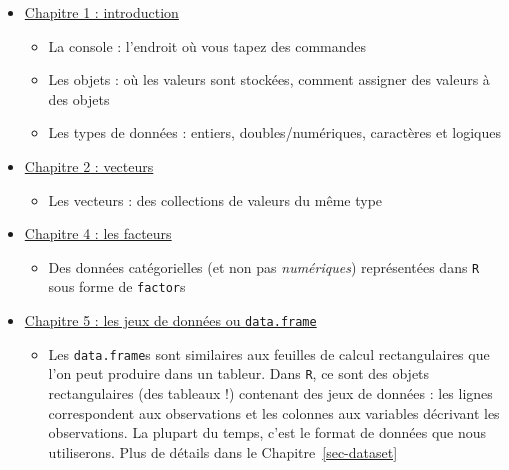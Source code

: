 \documentclass[
  letterpaper,
  DIV=11,
  numbers=noendperiod]{scrreprt}
\providecommand{\tightlist}{%
  \setlength{\itemsep}{0pt}\setlength{\parskip}{0pt}}\usepackage{longtable,booktabs,array}
\begin{document}
\begin{itemize}
\tightlist
\item
  \href{https://campus.datacamp.com/courses/introduction-a-r/chapitre-1-introduction?ex=1}{Chapitre
  1 : introduction}

  \begin{itemize}
  \tightlist
  \item
    La console : l'endroit où vous tapez des commandes
  \item
    Les objets : où les valeurs sont stockées, comment assigner des
    valeurs à des objets
  \item
    Les types de données : entiers, doubles/numériques, caractères et
    logiques
  \end{itemize}
\item
  \href{https://campus.datacamp.com/courses/introduction-a-r/chapitre-2-les-vecteurs?ex=1}{Chapitre
  2 : vecteurs}

  \begin{itemize}
  \tightlist
  \item
    Les vecteurs : des collections de valeurs du même type
  \end{itemize}
\item
  \href{https://campus.datacamp.com/courses/introduction-a-r/chapitre-4-facteurs?ex=1}{Chapitre
  4 : les facteurs}

  \begin{itemize}
  \tightlist
  \item
    Des données catégorielles (et non pas \emph{numériques})
    représentées dans \texttt{R} sous forme de \texttt{factor}s
  \end{itemize}
\item
  \href{https://campus.datacamp.com/courses/introduction-a-r/chapitre-5-les-jeux-de-donnees?ex=1}{Chapitre
  5 : les jeux de données ou \texttt{data.frame}}

  \begin{itemize}
  \tightlist
  \item
    Les \texttt{data.frame}s sont similaires aux feuilles de calcul
    rectangulaires que l'on peut produire dans un tableur. Dans
    \texttt{R}, ce sont des objets rectangulaires (des tableaux !)
    contenant des jeux de données : les lignes correspondent aux
    observations et les colonnes aux variables décrivant les
    observations. La plupart du temps, c'est le format de données que
    nous utiliserons. Plus de détails dans le Chapitre~\ref{sec-dataset}
  \end{itemize}
\end{itemize}
\end{document}
